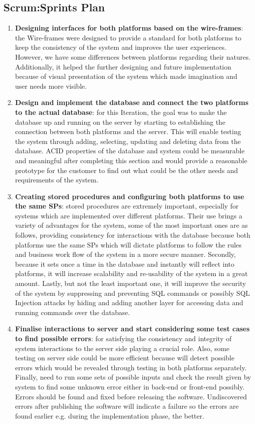 \documentclass{article}
\begin{document}
\begin{appendices}
\subsection{Scrum:Sprints Plan}
\begin{enumerate}
\item \textbf{Designing interfaces for both platforms based on the wire-frames}:
the Wire-frames were designed to provide a standard for both platforms to keep the consistency of the system and improves the user experiences. However, we have some differences between platforms regarding their natures. Additionally, it helped the further designing and future implementation because of visual presentation of the system which made imagination and user needs more visible. 
\item \textbf{Design and implement the database and connect the two platforms to the actual database}: 
for this Iteration, the goal was to make the database up and running on the server by starting to establishing the connection between both platforms and the server. This will enable testing the system through adding, selecting, updating and deleting data from the database. ACID properties of the database and system could be measurable and meaningful after completing this section and would provide a reasonable prototype for the customer to find out what could be the other needs and requirements of the system.
\item \textbf{Creating stored procedures and configuring both platforms to use the same SPs}:
stored procedures are extremely important, especially for systems which are implemented over different platforms. Their use brings a variety of advantages for the system, some of the most important ones are as follows, providing consistency for interactions with the database because both platforms use the same SPs which will dictate platforms to follow the rules and business work flow of the system in a more secure manner. Secondly, because it sets once a time in the database and instantly will reflect into platforms, it will increase scalability and re-usability of the system in a great amount. Lastly, but not the least important one, it will improve the security of the system by suppressing and preventing SQL commands or possibly SQL Injection attacks by hiding and adding another layer for accessing data and running commands over the database.
\item \textbf{Finalise interactions to server and start considering some test cases to find possible errors}:
for satisfying the consistency and integrity of system interactions to the server side playing a crucial role. Also, some testing on server side could be more efficient because will detect possible errors which would be revealed through testing in both platforms separately. Finally, need to run some sets of possible inputs and check the result given by system to find some unknown error either in back-end or front-end possibly. Errors should be found and fixed before releasing the software. Undiscovered errors after publishing the software will indicate a failure so the errors are found earlier e.g. during the implementation phase, the better. 

\end{enumerate}
\end{appendices}
\end{document}
